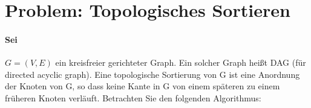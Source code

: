 \section{Problem: Topologisches Sortieren} 

\vspace{0.5em}
\noindent
\paragraph{Sei} $G = (V, E)$ ein kreisfreier gerichteter Graph. Ein solcher Graph heißt DAG (für
directed acyclic graph). Eine topologische Sortierung von G ist eine Anordnung
der Knoten von G, so dass keine Kante in G von einem späteren zu einem früheren
Knoten verläuft. Betrachten Sie den folgenden Algorithmus: